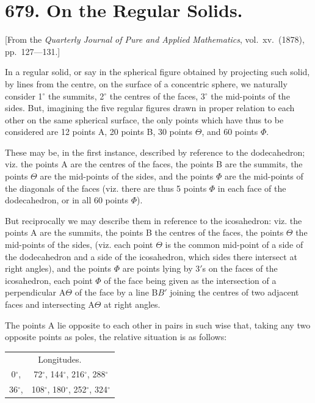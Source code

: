 \documentclass[12pt,a4paper]{article}
\theoremstyle{cayley}
\theoremstyle{definition}
\numberwithin{equation}{section}
\begin{document}
\newpage

\section*{679. On the Regular Solids.}

[From the \textit{Quarterly Journal of Pure and Applied Mathematics}, vol.\ xv.\ (1878), pp.\ 127---131.]

In a regular solid, or say in the spherical figure obtained by projecting such solid, by lines from the centre, on the surface of a concentric sphere, we naturally consider 1$^\circ$ the summits, 2$^\circ$ the centres of the faces, 3$^\circ$ the mid-points of the sides. But, imagining the five regular figures drawn in proper relation to each other on the same spherical surface, the only points which have thus to be considered are 12 points A, 20 points B, 30 points $\Theta$, and 60 points $\Phi$.

These may be, in the first instance, described by reference to the dodecahedron; viz. the points A are the centres of the faces, the points B are the summits, the points $\Theta$ are the mid-points of the sides, and the points $\Phi$ are the mid-points of the diagonals of the faces (viz. there are thus 5 points $\Phi$ in each face of the dodecahedron, or in all 60 points $\Phi$).

But reciprocally we may describe them in reference to the icosahedron: viz. the points A are the summits, the points B the centres of the faces, the points $\Theta$ the mid-points of the sides, (viz. each point $\Theta$ is the common mid-point of a side of the dodecahedron and a side of the icosahedron, which sides there intersect at right angles), and the points $\Phi$ are points lying by 3$'$s on the faces of the icosahedron, each point $\Phi$ of the face being given as the intersection of a perpendicular A$\Theta$ of the face by a line B$B'$ joining the centres of two adjacent faces and intersecting A$\Theta$ at right angles.

The points A lie opposite to each other in pairs in such wise that, taking any two opposite points as poles, the relative situation is as follows:

\begin{center}
\begin{tabular}{cc}
\multicolumn{2}{c}{Longitudes.} \\
0$^\circ$, & 72$^\circ$, 144$^\circ$, 216$^\circ$, 288$^\circ$ \\
36$^\circ$, & 108$^\circ$, 180$^\circ$, 252$^\circ$, 324$^\circ$ \\
\end{tabular}
\end{center}
\end{document}
